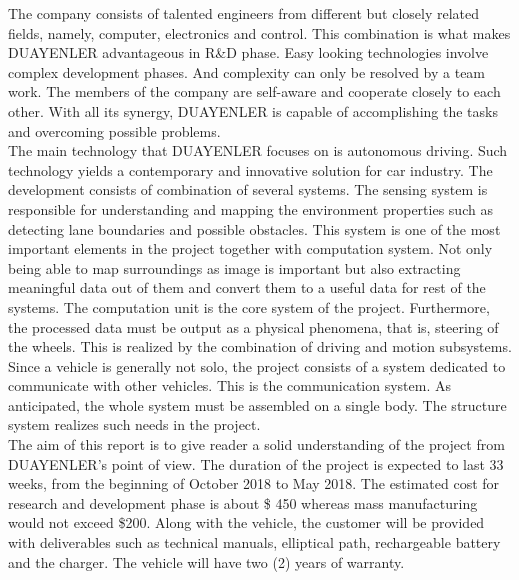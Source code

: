 \documentclass[a4paper,12pt]{article}
\begin{document}
	The company consists of talented engineers from different but closely related fields, namely, computer, electronics and control. This combination is what makes DUAYENLER advantageous in R\&D phase. Easy looking technologies involve complex development phases. And complexity can only be resolved by a team work. The members of the company are self-aware and cooperate closely to each other. With all its synergy, DUAYENLER is capable of accomplishing the tasks and overcoming possible problems.\\
	
	The main technology that DUAYENLER focuses on is autonomous driving. Such technology yields a contemporary and innovative solution for car industry. The development consists of combination of several systems. The sensing system is responsible for understanding and mapping the environment properties such as detecting lane boundaries and possible obstacles. This system is one of the most important elements in the project together with computation system. Not only being able to map surroundings as image is important but also extracting meaningful data out of them and convert them to a useful data for rest of the systems. The computation unit is the core system of the project. Furthermore, the processed data must be output as a physical phenomena, that is, steering of the wheels. This is realized by the combination of driving and motion subsystems. Since a vehicle is generally not solo, the project consists of a system dedicated to communicate with other vehicles. This is the communication system. As anticipated, the whole system must be assembled on a single body. The structure system realizes such needs in the project.\\
	
	The aim of this report is to give reader a solid understanding of the project from DUAYENLER's point of view. The duration of the project is expected to last 33 weeks, from the beginning of October 2018 to May 2018. The estimated cost for research and development phase is about \$ 450 whereas mass manufacturing would not exceed \$200. Along with the vehicle, the customer will be provided with deliverables such as technical manuals, elliptical path, rechargeable battery and the charger. The vehicle will have two (2) years of warranty.
	
	
\end{document}
